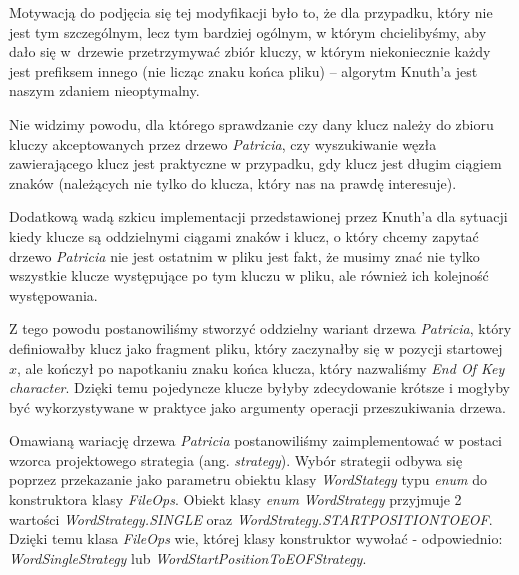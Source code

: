 		Motywacją do podjęcia się tej modyfikacji było to, że dla przypadku, który nie jest tym szczególnym, lecz tym bardziej ogólnym, w którym chcielibyśmy, aby dało się w~drzewie przetrzymywać zbiór kluczy, w którym niekoniecznie każdy jest prefiksem innego (nie licząc znaku końca pliku) -- algorytm Knuth'a jest naszym zdaniem nieoptymalny.
		
		Nie widzimy powodu, dla którego sprawdzanie czy dany klucz należy do zbioru kluczy akceptowanych przez drzewo \emph{Patricia}, czy wyszukiwanie węzła zawierającego klucz jest praktyczne w przypadku, gdy klucz jest długim ciągiem znaków (należących nie tylko do klucza, który nas na prawdę interesuje). 
		
		Dodatkową wadą szkicu implementacji przedstawionej przez Knuth'a dla sytuacji kiedy klucze są oddzielnymi ciągami znaków i klucz, o który chcemy zapytać drzewo \emph{Patricia} nie jest ostatnim w pliku jest fakt, że musimy znać nie tylko wszystkie klucze występujące po tym kluczu w pliku, ale również ich kolejność występowania.
		
		Z tego powodu postanowiliśmy stworzyć oddzielny wariant drzewa \emph{Patricia}, który definiowałby klucz jako fragment pliku, który zaczynałby się w pozycji startowej $x$, ale kończył po napotkaniu znaku końca klucza, który nazwaliśmy \emph{End Of Key character}. Dzięki temu pojedyncze klucze byłyby zdecydowanie krótsze i mogłyby być wykorzystywane w praktyce jako argumenty operacji przeszukiwania drzewa.
		
		Omawianą wariację drzewa \emph{Patricia} postanowiliśmy zaimplementować w postaci wzorca projektowego strategia (ang. \emph{strategy}). Wybór strategii odbywa się poprzez przekazanie jako parametru obiektu klasy \emph{WordStategy} typu \emph{enum} do konstruktora klasy \emph{FileOps}. Obiekt klasy \emph{enum} \emph{WordStrategy} przyjmuje 2 wartości \emph{WordStrategy.SINGLE} oraz \emph{WordStrategy.START\textunderscore POSITION\textunderscore TO\textunderscore EOF}. Dzięki temu klasa \emph{FileOps} wie, której klasy konstruktor wywołać - odpowiednio: \emph{WordSingleStrategy} lub \emph{WordStartPositionToEOFStrategy}.
		
